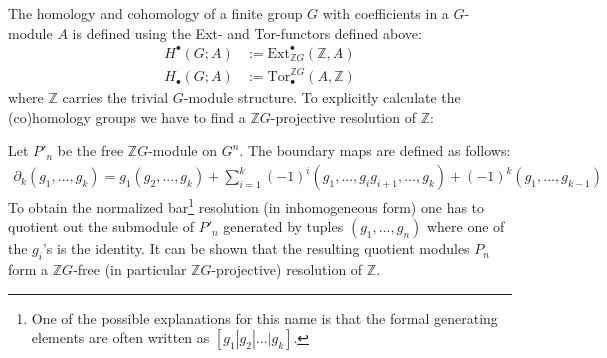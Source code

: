 	The homology and cohomology of a finite group $G$ with coefficients in a $G$-module $A$ is defined using the Ext- and Tor-functors defined above:
	\begin{align}
		H^\bullet(G; A) &:= \text{Ext}_{\mathbb{Z}G}^\bullet(\mathbb{Z}, A)\\
		H_\bullet(G; A) &:= \text{Tor}^{\mathbb{Z}G}_\bullet(A, \mathbb{Z})
	\end{align}
	where $\mathbb{Z}$ carries the trivial $G$-module structure. To explicitly calculate the (co)homology groups we have to find a $\mathbb{Z}G$-projective resolution of $\mathbb{Z}$:
	\begin{construct}
		Let $P'_n$ be the free $\mathbb{Z}G$-module on $G^n$. The boundary maps are defined as follows:
		\begin{gather}
			\label{hom_group_boundary}
			\partial_k(g_1, ..., g_k) = g_1(g_2, ..., g_k) + \sum_{i=1}^k (-1)^i(g_1, ..., g_ig_{i+1}, ..., g_k) + (-1)^k (g_1, ..., g_{k-1})
		\end{gather}
		To obtain the normalized bar\footnote{One of the possible explanations for this name is that the formal generating elements are often written as $[g_1|g_2|...|g_k]$.} resolution (in inhomogeneous form) one has to quotient out the submodule of $P'_n$ generated by tuples $(g_1,..., g_n)$ where one of the $g_i$'s is the identity. It can be shown that the resulting quotient modules $P_n$ form a $\mathbb{Z}G$-free (in particular $\mathbb{Z}G$-projective) resolution of $\mathbb{Z}$.
	\end{construct}
	

